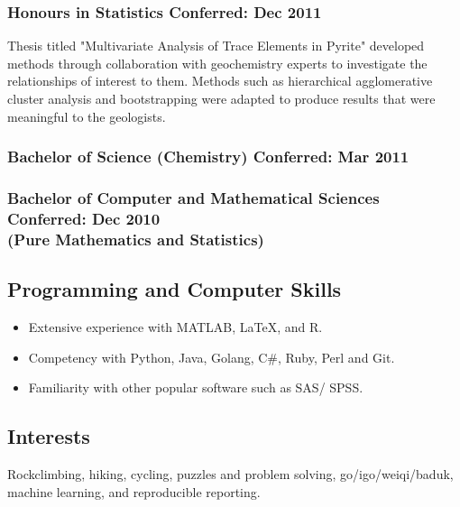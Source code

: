 \documentclass[a4paper,12pt]{report}
\begin{document}
\subsubsection*{Honours in Statistics \hfill Conferred: Dec 2011} \vspace{-6pt}
Thesis titled "Multivariate Analysis of Trace Elements in Pyrite" developed methods through collaboration with geochemistry experts to investigate the relationships of interest to them. Methods such as hierarchical agglomerative cluster analysis and bootstrapping were adapted to produce results that were meaningful to the geologists.

\subsubsection*{Bachelor of Science (Chemistry) \hfill Conferred: Mar 2011}

\subsubsection*{Bachelor of Computer and Mathematical Sciences \hfill Conferred: Dec 2010 \\ (Pure Mathematics and Statistics)}

\subsection*{Programming and Computer Skills}          
\begin{itemize}
	\item Extensive experience with MATLAB, \LaTeX, and R.
	\item Competency with Python, Java, Golang, C\#, Ruby, Perl and Git. 
	\item Familiarity with other popular software such as SAS/ SPSS.
\end{itemize}

\subsection*{Interests}          
Rockclimbing, hiking, cycling, puzzles and problem solving, go/igo/weiqi/baduk, machine learning, and reproducible reporting. 
\end{document}

